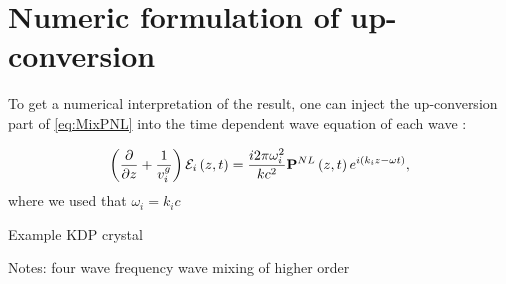 \section{Numeric formulation of up-conversion}
\label{sec:mixing-numeric}

To get a numerical interpretation of the result, one can inject the up-conversion part of \cref{eq:MixPNL} into the time dependent wave equation of each wave \cite[Equation 3.39]{shen}:

\begin{align}
\left( \frac{\partial }{\partial z}  + \frac{1}{v_i^{g}} \right) \mathcal{E}_i \left(z, t\right) = \frac{i 2 \pi \omega_i^{2}}{k c^2} \mathbf{P}^{NL} \left(z,t\right) e^{i \left(k_i z - \omega t\right)},
\end{align}
where we used that $\omega_i = k_ic$


Example KDP crystal

Notes:
four wave frequency wave mixing of higher order

